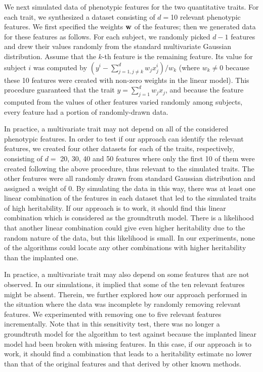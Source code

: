 \documentclass[10pt,letterpaper]{article}
\newcommand{\vect}[1]{\ensuremath\boldsymbol{\rm #1}}
\begin{document}
We next simulated data of phenotypic features for the two quantitative traits. For each trait, we synthesized a dataset consisting of $d=$10 relevant phenotypic features. We first specified the weights $\vect w$ of the features; then we generated data for these features as follows. For each subject, we randomly picked $d-1$ features and drew their values randomly from the standard multivariate Gaussian distribution. Assume that the $k$-th feature is the remaining feature. Its value for subject $i$ was computed by $(y^i - \sum_{j=1, j\ne k}^{d} w_j x_j^i)/w_k$ (where $w_k \neq 0$ because these 10 features were created with non-zero weights in the linear model). This procedure guaranteed that the trait $y = \sum_{j=1}^d w_j x_j$, and because the feature computed from the values of other features varied randomly among subjects, every feature had a portion of randomly-drawn data. 

In practice, a multivariate trait may not depend on all of the considered phenotypic features. In order to test if our approach can identify the relevant features, we created four other datasets for each of the traits, respectively, consisting of $d=$ 20, 30, 40 and 50 features where only the first 10 of them were created following the above procedure, thus relevant to the simulated traits. The other features were all randomly drawn from standard Gaussian distribution and assigned a weight of 0.
By simulating the data in this way, there was at least one linear combination of the features in each dataset that led to the simulated traits of high heritability. If our approach is to work, it should find this linear combination which is considered as the groundtruth model. There is a likelihood that another linear combination could give even higher heritability due to the random nature of the data, but this likelihood is small. In our experiments, none of the algorithms could locate any other combinations with higher heritability than the implanted one.

In practice, a multivariate trait may also depend on some features that are not observed. In our simulations, it implied that some of the ten relevant features might be absent. Therein, we further explored how our approach performed in the situation where the data was incomplete by randomly removing relevant features. We experimented with removing one to five relevant features incrementally. Note that in this sensitivity test, there was no longer a groundtruth model for the algorithm to test against because the implanted linear model had been broken with missing features. In this case, if our approach is to work, it should find a combination that leads to a heritability estimate no lower than that of the original features and that derived by other known methods.
\end{document}
